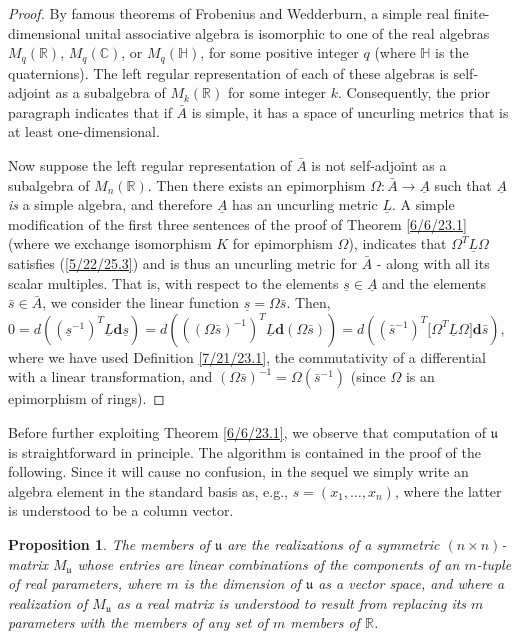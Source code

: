 \documentclass{amsart}
\newtheorem{proposition}[theorem]{Proposition}
\theoremstyle{definition}
\numberwithin{theorem}{section}
\numberwithin{equation}{section}
\begin{document}
\begin{proof}
 By famous theorems of Frobenius and Wedderburn, a simple real finite-dimensional unital associative algebra is isomorphic to one of the real algebras $M_q(\mathbb{R})$, $M_q(\mathbb{C})$, or $M_q(\mathbb{H})$, for some positive integer $q$ (where $\mathbb{H}$ is the quaternions).  The left regular representation of each of these algebras is self-adjoint as a subalgebra of $M_k(\mathbb{R})$ for some integer $k$.  Consequently, the prior paragraph indicates that if $\bar{A}$ is simple, it has a space of uncurling metrics that is at least one-dimensional.  
 
 Now suppose the left regular representation of $\bar{A}$ is not self-adjoint as a subalgebra of $M_n(\mathbb{R})$. Then there exists an epimorphism $\Omega:\bar{A}\rightarrow \underline{A}$ such that $ \underline{A}$ {\it is} a simple algebra, and therefore $\underline{A}$ has an uncurling metric $\underline{L}$.  A simple modification of the first three sentences of the proof of Theorem \ref{6/6/23.1} (where we exchange isomorphism $K$ for epimorphism $\Omega$), indicates that $\Omega^T \underline{L}\Omega$ satisfies (\ref{5/22/25.3}) and is thus an uncurling metric for $\bar{A}$ - along with all its scalar multiples.   That is, with respect to the elements $\underline{s}\in \underline{A}$ and the elements $\bar{s}\in\bar{A}$, we consider the linear function $\underline{s}= \Omega \bar{s}$.  Then, $0 = d\left((\underline{s}^{-1})^T \underline{L} \mathbf{d}\underline{s}\right) =  d\left(((\Omega \bar{s})^{-1})^T \underline{L} \mathbf{d}(\Omega \bar{s})\right) = d\left((\bar{s}^{-1})^T \big[\Omega^T \underline{L} \Omega \big]\mathbf{d}\bar{s}\right)$, where we have used Definition \ref{7/21/23.1}, the commutativity of a differential with a linear transformation, and $(\Omega \bar{s})^{-1} = \Omega (\bar{s}^{-1})$ (since $\Omega$ is an epimorphism of rings).   
  \end{proof}
 
 
Before further exploiting Theorem \ref{6/6/23.1}, we  observe that computation of $\mathfrak{u}$ is straightforward in principle.  The algorithm is contained in the proof of the following.  Since it will cause no confusion, in the sequel we simply write an algebra element in the standard basis as, e.g., $s=(x_1,\dots,x_n)$, where the latter is understood to be a column vector.

\begin{proposition}\label{9/2/24.1} The members of $\mathfrak{u}$ are the realizations of a symmetric $(n\times n)$-matrix $M_{\mathfrak{u}}$ whose entries are linear combinations of the components of an $m$-tuple of real parameters, where $m$ is the dimension of $\mathfrak{u}$ as a vector space, and where a realization of $M_{\mathfrak{u}}$ as a real matrix is understood to result from replacing its $m$ parameters with the members of any set of $m$ members of $\mathbb{R}$.   
\end{proposition}
\end{document}
